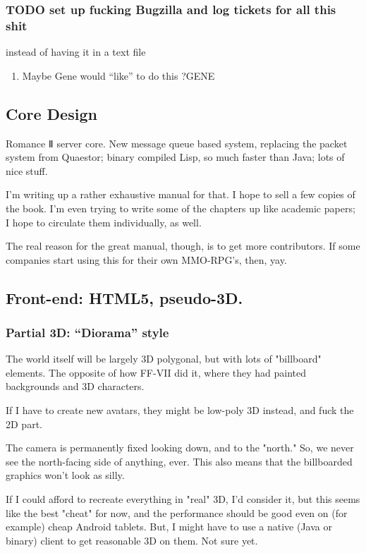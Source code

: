 \documentclass[11pt]{article}
\begin{document}
\subsubsection{{\bfseries\sffamily TODO} set up fucking Bugzilla and log tickets for all this shit}
\label{sec-1-3-3}
instead of having it in a text file

\begin{enumerate}
\item Maybe Gene would “like” to do this ?\hfill{}\textsc{GENE}
\label{sec-1-3-3-1}
\end{enumerate}
\subsection{Core Design}
\label{sec-1-4}

Romance Ⅱ server core. New  message queue based system, replacing the
packet system from Quaestor; binary compiled Lisp, so much faster than
Java; lots of nice stuff.

I'm writing up a  rather exhaustive manual for that. I  hope to sell a
few copies of the book. I'm even  trying to write some of the chapters
up  like  academic papers;  I  hope  to circulate  them  individually,
as well.

The  real  reason  for  the  great manual,  though,  is  to  get  more
contributors.  If  some  companies  start using  this  for  their  own
MMO-RPG's, then, yay.
\subsection{Front-end: HTML5, pseudo-3D.}
\label{sec-1-5}

\subsubsection{Partial 3D: “Diorama” style}
\label{sec-1-5-1}

The  world itself  will  be largely  3D polygonal,  but  with lots  of
"billboard" elements.  The opposite of  how FF-VII did it,  where they
had painted backgrounds and 3D characters.

If I  have to create new  avatars, they might be  low-poly 3D instead,
and fuck the 2D part.

The camera is permanently fixed looking  down, and to the "north." So,
we never see the north-facing side  of anything, ever. This also means
that the billboarded graphics won't look as silly.

If I  could afford to recreate  everything in "real" 3D,  I'd consider
it, but this seems like the  best "cheat" for now, and the performance
should be  good even on  (for example)  cheap Android tablets.  But, I
might have to  use a native (Java or binary)  client to get reasonable
3D on them. Not sure yet.
\end{document}
